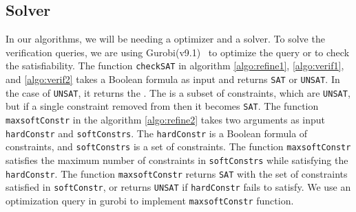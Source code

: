 


\subsection{Solver}
\label{sec:solver}

In our algorithms, we will be needing a optimizer and a solver.
To solve the verification queries,
we are using Gurobi(v9.1)~\cite{gurobioptimizer} to optimize the query or to check the satisfiability. 
The function \texttt{checkSAT} in algorithm \ref{algo:refine1}, \ref{algo:verif1}, and
\ref{algo:verif2} 
takes a Boolean formula as input and returns \texttt{SAT} or \texttt{UNSAT}. 
In the case of \texttt{UNSAT}, it returns the \unsatcore{}. 
The \unsatcore{} is a subset of constraints, which are \texttt{UNSAT}, 
but if a single constraint removed from \unsatcore{} then it becomes \texttt{SAT}.
The function \texttt{maxsoftConstr} in the algorithm \ref{algo:refine2} takes
two arguments as input \texttt{hardConstr} and \texttt{softConstrs}. 
The \texttt{hardConstr} is a Boolean formula of constraints,
and \texttt{softConstrs} is a set of constraints. 
The function \texttt{maxsoftConstr} satisfies the maximum number of constraints
in \texttt{softConstrs} while satisfying the \texttt{hardConstr}. 
The function \texttt{maxsoftConstr} returns \texttt{SAT} with the set of
constraints satisfied in \texttt{softConstr}, or returns
\texttt{UNSAT} if \texttt{hardConstr} fails to satisfy.
We use an optimization query in gurobi to implement \texttt{maxsoftConstr} function.



